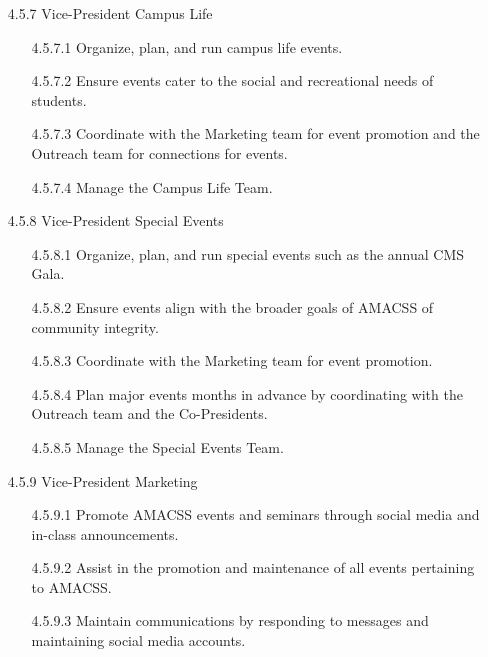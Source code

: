 \documentclass[12pt,a4paper]{article}
\begin{document}
\begin{enumerate}
\begin{enumerate}
\item[4.5.7] Vice-President Campus Life

\begin{enumerate}
\item[4.5.7.1] Organize, plan, and run campus life events.

\item[4.5.7.2] Ensure events cater to the social and recreational needs of students.

\item[4.5.7.3] Coordinate with the Marketing team for event promotion and the Outreach team for connections for events.

\item[4.5.7.4] Manage the Campus Life Team.
\end{enumerate}

\item[4.5.8] Vice-President Special Events

\begin{enumerate}
\item[4.5.8.1] Organize, plan, and run special events such as the annual CMS Gala. 

\item[4.5.8.2] Ensure events align with the broader goals of AMACSS of community integrity.

\item[4.5.8.3] Coordinate with the Marketing team for event promotion.

\item[4.5.8.4] Plan major events months in advance by coordinating with the Outreach team and the Co-Presidents.

\item[4.5.8.5] Manage the Special Events Team.
\end{enumerate}

\item[4.5.9] Vice-President Marketing

\begin{enumerate}
\item[4.5.9.1] Promote AMACSS events and seminars through social media and in-class announcements.

\item[4.5.9.2] Assist in the promotion and maintenance of all events pertaining to AMACSS.

\item[4.5.9.3] Maintain communications by responding to messages and maintaining social media accounts.


\end{enumerate}
\end{enumerate}
\end{enumerate}
\end{document}
